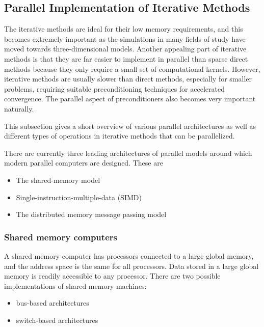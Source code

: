 \subsection{Parallel Implementation of Iterative Methods}
\label{section:parallel}
The iterative methods are ideal for their low memory requirements, and this becomes extremely important as the simulations in many fields of study have moved towards three-dimensional models. Another appealing part of iterative methods is that they are far easier to implement in parallel than sparse direct methods because they only require a small set of computational kernels. However, iterative methods are usually slower than direct methods, especially for smaller problems, requiring suitable preconditioning techniques for accelerated convergence. The parallel aspect of preconditioners also becomes very important naturally.

This subsection gives a short overview of various parallel architectures as well as different types of operations in iterative methods that can be parallelized.

There are currently three leading architectures of parallel models around which modern parallel computers are designed. These are
\begin{itemize}
    \item The shared-memory model
    \item Single-instruction-multiple-data (SIMD)
    \item The distributed memory message passing model
\end{itemize}

\subsubsection{Shared memory computers}
A shared memory computer has processors connected to a large global memory, and the address space is the same for all processors. Data stored in a large global memory is readily accessible to any processor. There are two possible implementations of shared memory machines: 
\begin{itemize}
    \item bus-based architectures
    \item switch-based architectures
\end{itemize}

